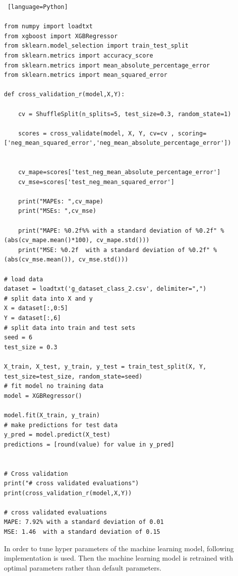 \begin{lstlisting} [language=Python]

from numpy import loadtxt
from xgboost import XGBRegressor
from sklearn.model_selection import train_test_split
from sklearn.metrics import accuracy_score
from sklearn.metrics import mean_absolute_percentage_error
from sklearn.metrics import mean_squared_error

def cross_validation_r(model,X,Y):

	cv = ShuffleSplit(n_splits=5, test_size=0.3, random_state=1)
	
	scores = cross_validate(model, X, Y, cv=cv , scoring=['neg_mean_squared_error','neg_mean_absolute_percentage_error'])
	
	
	cv_mape=scores['test_neg_mean_absolute_percentage_error']
	cv_mse=scores['test_neg_mean_squared_error']
	
	print("MAPEs: ",cv_mape)
	print("MSEs: ",cv_mse)
	
	print("MAPE: %0.2f%% with a standard deviation of %0.2f" % (abs(cv_mape.mean()*100), cv_mape.std()))
	print("MSE: %0.2f  with a standard deviation of %0.2f" % (abs(cv_mse.mean()), cv_mse.std()))
	
# load data
dataset = loadtxt('g_dataset_class_2.csv', delimiter=",")
# split data into X and y
X = dataset[:,0:5]
Y = dataset[:,6]
# split data into train and test sets
seed = 6
test_size = 0.3

X_train, X_test, y_train, y_test = train_test_split(X, Y, test_size=test_size, random_state=seed)
# fit model no training data
model = XGBRegressor()

model.fit(X_train, y_train)
# make predictions for test data
y_pred = model.predict(X_test)
predictions = [round(value) for value in y_pred]


# Cross validation
print("# cross validated evaluations")
print(cross_validation_r(model,X,Y))

# cross validated evaluations
MAPE: 7.92% with a standard deviation of 0.01
MSE: 1.46  with a standard deviation of 0.15

\end{lstlisting}

In order to tune hyper parameters of the machine learning model, following implementation is used. Then the machine learning model is retrained with optimal parameters rather than default parameters.


